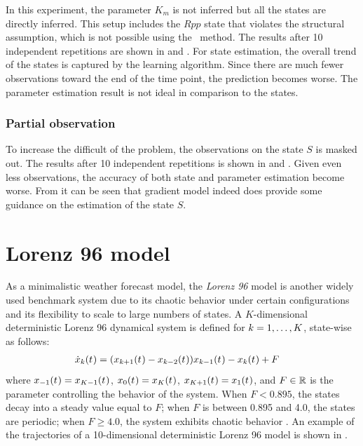 In this experiment, the parameter $K_m$ is not inferred but all the states are directly inferred.
This setup includes the $Rpp$ state that violates the structural assumption, which is not possible using the \algovgmgp\ method.
The results after 10 independent repetitions are shown in  and .
For state estimation, the overall trend of the states is captured by the learning algorithm.
Since there are much fewer observations toward the end of the time point, the prediction becomes worse.
The parameter estimation result is not ideal in comparison to the states.

\subsubsection*{Partial observation}

To increase the difficult of the problem, the observations on the state $S$ is masked out.
The results after 10 independent repetitions is shown in  and .
Given even less observations, the accuracy of both state and parameter estimation become worse.
From  it can be seen that gradient model indeed does provide some guidance on the estimation of the state $S$.

\section{Lorenz 96 model}
\label{sec-lorenz-96}

As a minimalistic weather forecast model, the \emph{Lorenz 96} model \citep{lorenz1996predictability} is another widely used benchmark system due to its chaotic behavior under certain configurations and its flexibility to scale to large numbers of states.
A $K$-dimensional deterministic Lorenz 96 dynamical system is defined for $k = 1,\dots,K$, state-wise as follows:
\begin{align}
    \dot{x}_{k}(t_{})
     & = (x_{k+1}(t_{}) - x_{k-2}(t_{}))x_{k-1}(t_{}) - x_{k}(t_{}) + F
    \label{eq-lorenz-96-drift}
\end{align}
where $x_{-1}(t_{}) = x_{K-1}(t_{})$, $x_{0}(t_{}) = x_{K}(t_{})$, $x_{K+1}(t_{})=x_{1}(t_{})$, and $F \in \mathbb{R}$ is the parameter controlling the behavior of the system.
When $F < 0.895$, the states decay into a steady value equal to $F$; when $F$ is between 0.895 and 4.0, the states are periodic; when $F \geqslant 4.0$, the system exhibits chaotic behavior \citep{vrettas2015variational}.
An example of the trajectories of a 10-dimensional deterministic Lorenz 96 model is shown in .

